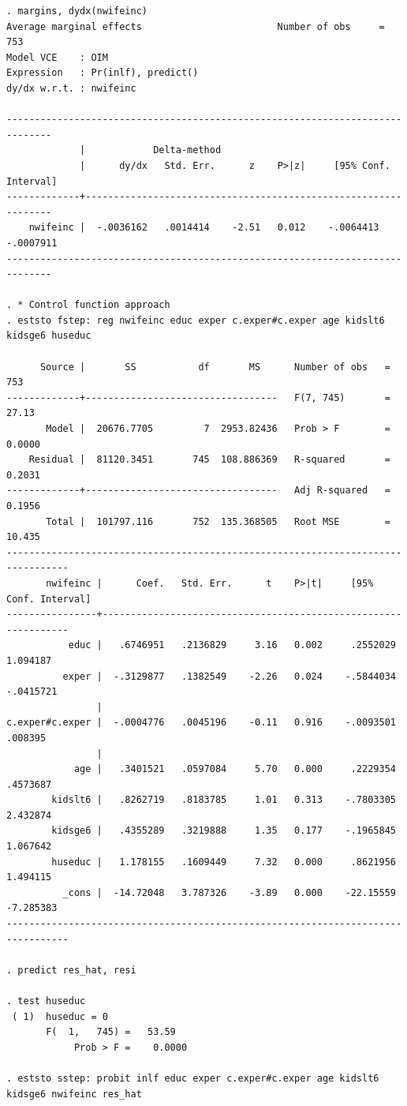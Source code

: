 \begin{verbatim}
. margins, dydx(nwifeinc)
Average marginal effects                        Number of obs     =        753
Model VCE    : OIM
Expression   : Pr(inlf), predict()
dy/dx w.r.t. : nwifeinc

------------------------------------------------------------------------------
             |            Delta-method
             |      dy/dx   Std. Err.      z    P>|z|     [95% Conf. Interval]
-------------+----------------------------------------------------------------
    nwifeinc |  -.0036162   .0014414    -2.51   0.012    -.0064413   -.0007911
------------------------------------------------------------------------------

. * Control function approach
. eststo fstep: reg nwifeinc educ exper c.exper#c.exper age kidslt6 kidsge6 huseduc

      Source |       SS           df       MS      Number of obs   =       753
-------------+----------------------------------   F(7, 745)       =     27.13
       Model |  20676.7705         7  2953.82436   Prob > F        =    0.0000
    Residual |  81120.3451       745  108.886369   R-squared       =    0.2031
-------------+----------------------------------   Adj R-squared   =    0.1956
       Total |  101797.116       752  135.368505   Root MSE        =    10.435
---------------------------------------------------------------------------------
       nwifeinc |      Coef.   Std. Err.      t    P>|t|     [95% Conf. Interval]
----------------+----------------------------------------------------------------
           educ |   .6746951   .2136829     3.16   0.002     .2552029    1.094187
          exper |  -.3129877   .1382549    -2.26   0.024    -.5844034   -.0415721
                |
c.exper#c.exper |  -.0004776   .0045196    -0.11   0.916    -.0093501     .008395
                |
            age |   .3401521   .0597084     5.70   0.000     .2229354    .4573687
        kidslt6 |   .8262719   .8183785     1.01   0.313    -.7803305    2.432874
        kidsge6 |   .4355289   .3219888     1.35   0.177    -.1965845    1.067642
        huseduc |   1.178155   .1609449     7.32   0.000     .8621956    1.494115
          _cons |  -14.72048   3.787326    -3.89   0.000    -22.15559   -7.285383
---------------------------------------------------------------------------------

. predict res_hat, resi

. test huseduc
 ( 1)  huseduc = 0
       F(  1,   745) =   53.59
            Prob > F =    0.0000

. eststo sstep: probit inlf educ exper c.exper#c.exper age kidslt6 kidsge6 nwifeinc res_hat


\end{verbatim}
